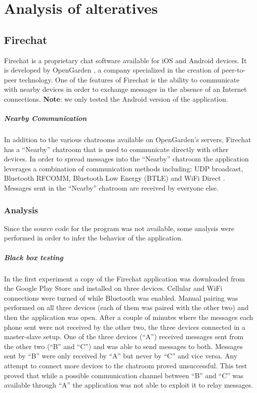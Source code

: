 \chapter{Analysis of alteratives}
\section{Firechat}
Firechat is a proprietary chat software available for iOS and Android devices.
It is developed by OpenGarden \cite{opengarden}, a company specialized in the creation of peer-to-peer technology.
One of the features of Firechat is the ability to communicate with nearby devices in order to exchange messages in the absence of an Internet connections.
\textbf{Note}: we only tested the Android version of the application.

\paragraph{Nearby Communication} In addition to the various chatrooms available on OpenGarden's servers, Firechat has a ``Nearby'' chatroom that is used to communicate directly with other devices.
In order to spread messages into the ``Nearby'' chatroom the application leverages a combination of communication methods including: UDP broadcast, Bluetooth RFCOMM, Bluetooth Low Energy (BTLE) \cite{btle} and WiFi Direct \cite{wifi-direct}.
Messages sent in the ``Nearby'' chatroom are received by everyone else.

\subsection{Analysis}
Since the source code for the program was not available, some analysis were performed in order to infer the behavior of the application.

\paragraph{Black box testing}
In the first experiment a copy of the Firechat application was downloaded from the Google Play Store \cite{google-play-store} and installed on three devices.
Cellular and WiFi connections were turned of while Bluetooth was enabled.
Manual pairing was performed on all three devices (each of them was paired with the other two) and then the application was open.
After a couple of minutes where the messages each phone sent were not received by the other two, the three devices connected in a master-slave setup.
One of the three devices (``A'') received messages sent from the other two (``B'' and ``C'') and was able to send messages to both.
Messages sent by ``B'' were only received by ``A'' but never by ``C'' and vice versa.
Any attempt to connect more devices to the chatroom proved unsuccessful.
This test proved that while a possible communication channel between ``B'' and ``C'' was available through ``A'' the application was not able to exploit it to relay messages.\\

